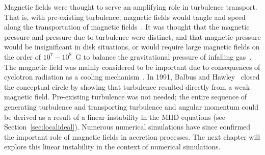 Magnetic fields were thought to serve an amplifying role in turbulence transport. That is, with pre-existing turbulence, magnetic fields would tangle and speed along the transportation of magnetic fields~\cite{SS1973}. It was thought that the magnetic pressure and pressure due to turbulence were distinct, and that magnetic pressure would be insignificant in disk situations, or would require large magnetic fields on the order of $10^7-10^8$~G to balance the gravitational pressure of infalling gas~\cite{BH1998}. The magnetic field was mainly considered to be important due to consequences of cyclotron radiation as a cooling mechanism~\cite{Shapiro1973}. In 1991, Balbus and Hawley~\cite{BH1991a,BH1991b,BH1991c} closed the conceptual circle by showing that turbulence resulted directly from a weak magnetic field. Pre-existing turbulence was not needed; the entire sequence of generating turbulence and transporting turbulence and angular momentum could be derived as a result of a linear instability in the MHD equations (see Section~\ref{sec:localideal}). Numerous numerical simulations have since confirmed the important role of magnetic fields in accretion processes. The next chapter will explore this linear instability in the context of numerical simulations.

